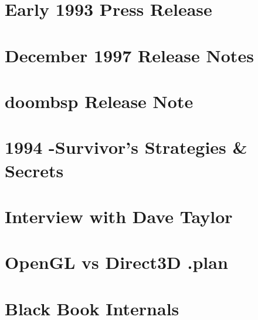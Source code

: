 \documentclass{book}
\begin{document}
      \chapter{Early 1993 Press Release}
      
      \chapter{December 1997 Release Notes}
      
      \chapter{doombsp Release Note}
      
      \chapter{1994 -Survivor's Strategies \& Secrets}
      
   
      \chapter{Interview with Dave Taylor}
      
      \chapter{OpenGL vs Direct3D .plan}
      
        \chapter{Black Book Internals}
    
    \cleartoleftpage %
    
    \blankpage
    \blankpage
\end{document}
